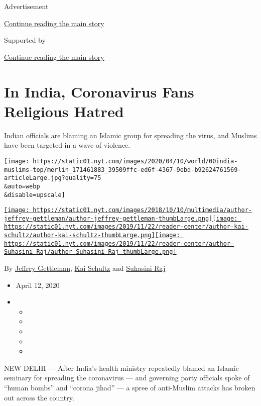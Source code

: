 Advertisement

\protect\hyperlink{after-top}{Continue reading the main story}

Supported by

\protect\hyperlink{after-sponsor}{Continue reading the main story}

\hypertarget{in-india-coronavirus-fans-religious-hatred}{%
\section{In India, Coronavirus Fans Religious
Hatred}\label{in-india-coronavirus-fans-religious-hatred}}

Indian officials are blaming an Islamic group for spreading the virus,
and Muslims have been targeted in a wave of violence.

\texttt{[image: https://static01.nyt.com/images/2020/04/10/world/00india-muslims-top/merlin\_171461883\_39509ffc-ed6f-4367-9ebd-b92624761569-articleLarge.jpg?quality=75\\\&auto=webp\\\&disable=upscale]}

\href{https://www.nytimes.com/by/jeffrey-gettleman}{\texttt{[image: https://static01.nyt.com/images/2018/10/10/multimedia/author-jeffrey-gettleman/author-jeffrey-gettleman-thumbLarge.png]}}\href{https://www.nytimes.com/by/kai-schultz}{\texttt{[image: https://static01.nyt.com/images/2019/11/22/reader-center/author-kai-schultz/author-kai-schultz-thumbLarge.png]}}\href{https://www.nytimes.com/by/suhasini-raj}{\texttt{[image: https://static01.nyt.com/images/2019/11/22/reader-center/author-Suhasini-Raj/author-Suhasini-Raj-thumbLarge.png]}}

By \href{https://www.nytimes.com/by/jeffrey-gettleman}{Jeffrey
Gettleman}, \href{https://www.nytimes.com/by/kai-schultz}{Kai Schultz}
and \href{https://www.nytimes.com/by/suhasini-raj}{Suhasini Raj}

\begin{itemize}
\item
  April 12, 2020
\item
  \begin{itemize}
  \item
  \item
  \item
  \item
  \item
  \end{itemize}
\end{itemize}

NEW DELHI --- After India's health ministry repeatedly blamed an Islamic
seminary for spreading the coronavirus --- and governing party officials
spoke of ``human bombs'' and ``corona jihad'' --- a spree of anti-Muslim
attacks has broken out across the country.

